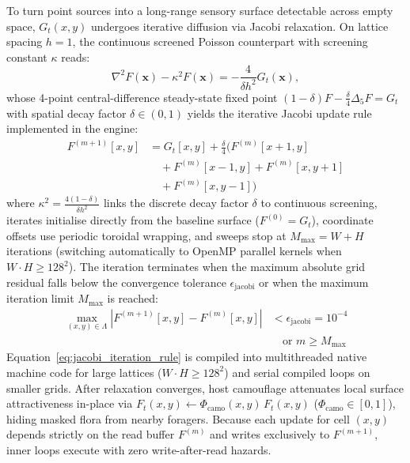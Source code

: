 To turn point sources into a long-range sensory surface detectable across empty space, $G_t(x, y)$ undergoes iterative diffusion via Jacobi relaxation. On lattice spacing $h = 1$, the continuous screened Poisson counterpart with screening constant $\kappa$ reads:
\begin{equation}
  \nabla^2 F(\mathbf{x}) - \kappa^2 F(\mathbf{x}) = -\frac{4}{\delta h^2} G_t(\mathbf{x}),
  \label{eq:screened_poisson}
\end{equation}
whose 4-point central-difference steady-state fixed point $(1-\delta) F - \frac{\delta}{4}\Delta_5 F = G_t$ with spatial decay factor $\delta \in (0, 1)$ yields the iterative Jacobi update rule implemented in the engine:
\begin{align}
  F^{(m+1)}[x, y] &= G_t[x, y] + \frac{\delta}{4} \Big( F^{(m)}[x+1, y] \nonumber \\
  &\quad + F^{(m)}[x-1, y] + F^{(m)}[x, y+1] \nonumber \\
  &\quad + F^{(m)}[x, y-1] \Big)
  \label{eq:jacobi_iteration_rule}
\end{align}
where $\kappa^2 = \frac{4(1-\delta)}{\delta h^2}$ links the discrete decay factor $\delta$ to continuous screening, iterates initialise directly from the baseline surface ($F^{(0)} = G_t$), coordinate offsets use periodic toroidal wrapping, and sweeps stop at $M_{\max} = W + H$ iterations (switching automatically to OpenMP parallel kernels when $W \cdot H \ge 128^2$). The iteration terminates when the maximum absolute grid residual falls below the convergence tolerance $\epsilon_{\text{jacobi}}$ or when the maximum iteration limit $M_{\max}$ is reached:
\begin{align}
  \max_{(x, y) \in \Lambda} \left| F^{(m+1)}[x, y] - F^{(m)}[x, y] \right| &< \epsilon_{\text{jacobi}} = 10^{-4} \nonumber \\
  &\quad \text{or } m \ge M_{\max}
  \label{eq:jacobi_stopping_criterion}
\end{align}
Equation~\eqref{eq:jacobi_iteration_rule} is compiled into multithreaded native machine code for large lattices ($W \cdot H \ge 128^2$) and serial compiled loops on smaller grids. After relaxation converges, host camouflage attenuates local surface attractiveness in-place via $F_t(x, y) \gets \Phi_{\text{camo}}(x, y)\,F_t(x, y)$ ($\Phi_{\text{camo}} \in [0, 1]$), hiding masked flora from nearby foragers. Because each update for cell $(x, y)$ depends strictly on the read buffer $F^{(m)}$ and writes exclusively to $F^{(m+1)}$, inner loops execute with zero write-after-read hazards.

